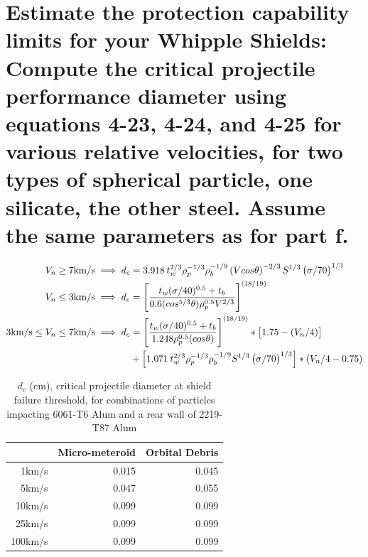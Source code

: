 \documentclass[onecolumn,10pt]{jhwhw}
\begin{document}
\part{Estimate the protection capability limits for your Whipple Shields: Compute the critical projectile performance diameter using equations 4-23, 4-24, and 4-25 for various relative velocities, for two types of spherical particle, one silicate, the other steel. Assume the same parameters as for part f.}
\begin{align*}
V_n \geq 7 \mbox{km/s} \implies d_c &= 3.918 \hspace{0.2em} t_w^{2/3} \rho_p^{-1/3} \rho_b^{-1/9} \left(V cos \theta \right)^{-2/3} S^{1/3} \left( \sigma / 70 \right)^{1/3} \\
V_n \leq 3 \mbox{km/s} \implies d_c &= \left[ \dfrac{t_w (\sigma/40)^{0.5} + t_b}{0.6(cos^{5/3} \theta) \rho_p^{0.5} V^{2/3}} \right]^{(18/19)} \\
3 \mbox{km/s} \leq V_n \leq 7 \mbox{km/s} \implies d_c &= \left[ \dfrac{t_w (\sigma/40)^{0.5} + t_b}{1.248 \rho_p^{0.5} (cos \theta)} \right]^{(18/19)} * \left[1.75-(V_n/4)\right] \\
                                    &+ \left[1.071 \hspace{0.2em} t_w^{2/3} \rho_p^{-1/3} \rho_b^{-1/9} S^{1/3} \left( \sigma / 70 \right)^{1/3} \right] * (V_n/4-0.75)
\end{align*}

\begin{table}[h]
\begin{center}
\begin{tabular}{r|rr}
\toprule
      &   Micro-meteroid &   Orbital Debris \\
\midrule
 1km/s   &            0.015 &            0.045 \\
 5km/s   &            0.047 &            0.055 \\
 10km/s  &            0.099 &            0.099 \\
 25km/s  &            0.099 &            0.099 \\
 100km/s &            0.099 &            0.099 \\
\bottomrule
\end{tabular}
\end{center}
\caption{$d_c$ (cm), critical projectile diameter at shield failure threshold, for combinations of particles impacting 6061-T6 Alum and a rear wall of 2219-T87 Alum}
\end{table}


\end{document}
